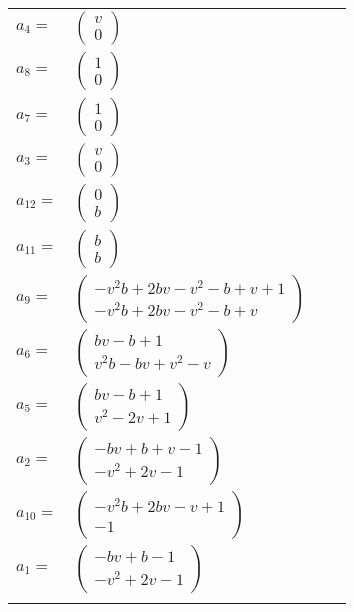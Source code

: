 \documentclass[1p]{elsarticle_modified}
\theoremstyle{definition}
\begin{document}
\begin{tabular}{m{7pt} m{180pt} m{7pt} m{180pt} }
\flushright $a_{4}=$&$\begin{pmatrix}v\\0\end{pmatrix}$ \\
\flushright $a_{8}=$&$\begin{pmatrix}1\\0\end{pmatrix}$ \\
\flushright $a_{7}=$&$\begin{pmatrix}1\\0\end{pmatrix}$ \\
\flushright $a_{3}=$&$\begin{pmatrix}v\\0\end{pmatrix}$ \\
\flushright $a_{12}=$&$\begin{pmatrix}0\\b\end{pmatrix}$ \\
\flushright $a_{11}=$&$\begin{pmatrix}b\\b\end{pmatrix}$ \\
\flushright $a_{9}=$&$\begin{pmatrix}- v^2 b+2 b v- v^2- b+v+1\\- v^2 b+2 b v- v^2- b+v\end{pmatrix}$ \\
\flushright $a_{6}=$&$\begin{pmatrix}b v- b+1\\v^2 b- b v+v^2- v\end{pmatrix}$ \\
\flushright $a_{5}=$&$\begin{pmatrix}b v- b+1\\v^2-2 v+1\end{pmatrix}$ \\
\flushright $a_{2}=$&$\begin{pmatrix}- b v+b+v-1\\- v^2+2 v-1\end{pmatrix}$ \\
\flushright $a_{10}=$&$\begin{pmatrix}- v^2 b+2 b v- v+1\\-1\end{pmatrix}$ \\
\flushright $a_{1}=$&$\begin{pmatrix}- b v+b-1\\- v^2+2 v-1\end{pmatrix}$\\&\end{tabular}
\end{document}
